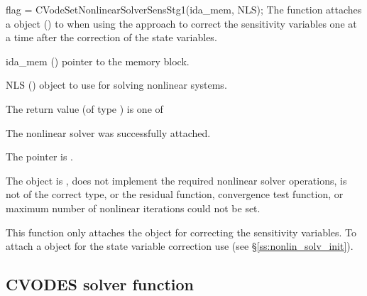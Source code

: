 {
  flag = CVodeSetNonlinearSolverSensStg1(ida\_mem, NLS);
}
{
  The function  attaches a {\sunnonlinsol}
  object () to {\cvodes} when using the  approach to
  correct the sensitivity variables one at a time after the correction of the
  state variables.
}
{
  \begin{args}
  \item[ida\_mem] ()
    pointer to the {\cvodes} memory block.
  \item[NLS] ()
    {\sunnonlinsol} object to use for solving nonlinear systems.
  \end{args}
}
{
  The return value  (of type ) is one of
  \begin{args}
  \item[\Id{CV\_SUCCESS}]
    The nonlinear solver was successfully attached.
  \item[\Id{CV\_MEM\_NULL}]
    The  pointer is .
  \item[\Id{CV\_ILL\_INPUT}]
    The {\sunnonlinsol} object is , does not implement the required
    nonlinear solver operations, is not of the correct type, or the residual
    function, convergence test function, or maximum number of nonlinear
    iterations could not be set.
  \end{args}
}
{
  This function only attaches the {\sunnonlinsol} object for correcting the
  sensitivity variables. To attach a {\sunnonlinsol} object for the state
  variable correction use  (see
  \S\ref{ss:nonlin_solv_init}).
}


\subsection{CVODES solver function}

